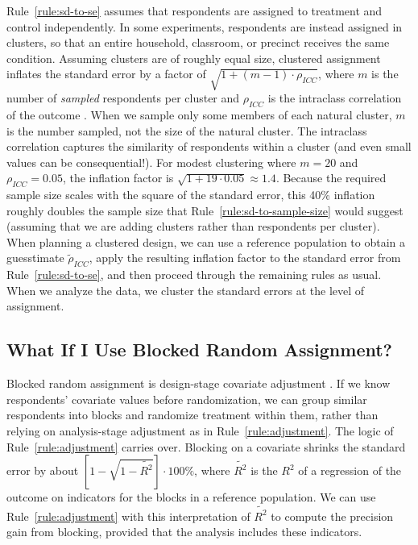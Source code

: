 \documentclass[12pt]{article}
\begin{document}
Rule~\ref{rule:sd-to-se} assumes that respondents are assigned to treatment and control independently.
In some experiments, respondents are instead assigned in clusters, so that an entire household, classroom, or precinct receives the same condition.
Assuming clusters are of roughly equal size, clustered assignment inflates the standard error by a factor of $\sqrt{1 + \left( m - 1 \right) \cdot \rho_{ICC}}$, where $m$ is the number of \textit{sampled} respondents per cluster and $\rho_{ICC}$ is the intraclass correlation of the outcome \citep[20--22]{Hayes2017}.
When we sample only some members of each natural cluster, $m$ is the number sampled, not the size of the natural cluster.
The intraclass correlation captures the similarity of respondents within a cluster (and even small values can be consequential!).
For modest clustering where $m = 20$ and $\rho_{ICC} = 0.05$, the inflation factor is $\sqrt{1 + 19 \cdot 0.05} \approx 1.4$.
Because the required sample size scales with the square of the standard error, this 40\% inflation roughly doubles the sample size that Rule~\ref{rule:sd-to-sample-size} would suggest (assuming that we are adding clusters rather than respondents per cluster).
When planning a clustered design, we can use a reference population to obtain a guesstimate $\widetilde{\rho}_{ICC}$, apply the resulting inflation factor to the standard error from Rule~\ref{rule:sd-to-se}, and then proceed through the remaining rules as usual.
When we analyze the data, we cluster the standard errors at the level of assignment.

\subsection*{What If I Use Blocked Random Assignment?}

Blocked random assignment is design-stage covariate adjustment \citep[109--115]{Gerber2012}.
If we know respondents' covariate values before randomization, we can group similar respondents into blocks and randomize treatment within them, rather than relying on analysis-stage adjustment as in Rule~\ref{rule:adjustment}.
The logic of Rule~\ref{rule:adjustment} carries over.
Blocking on a covariate shrinks the standard error by about $\left[ 1 - \sqrt{1 - \widetilde{R^{2}}} \right] \cdot 100\%$, where $\widetilde{R^{2}}$ is the $R^{2}$ of a regression of the outcome on indicators for the blocks in a reference population.
We can use Rule~\ref{rule:adjustment} with this interpretation of $\widetilde{R^{2}}$ to compute the precision gain from blocking, provided that the analysis includes these indicators.
\end{document}
